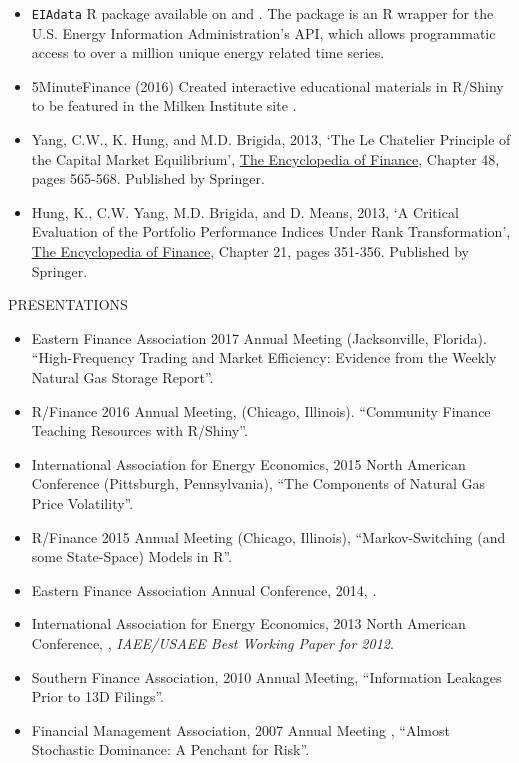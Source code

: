 \documentclass[9pt]{article}
\begin{document}
\begin{itemize}[noitemsep, nolistsep]
\item \texttt{EIAdata} R package available on \href{http://cran.r-project.org/package=EIAdata}{\color{Blue}{CRAN (stable)}} and \href{https://github.com/Matt-Brigida/EIAdata}{\color{Blue}{Github (development)}}.  The package is an R wrapper for the U.S. Energy Information Administration's API, which allows programmatic access to over a million unique energy related time series.
\item 5MinuteFinance (2016) Created interactive educational materials in R/Shiny to be featured in the Milken Institute site {\color{blue}{5MinuteFinance.org}}. 
\item Yang, C.W., K. Hung, and M.D. Brigida, 2013, `The Le Chatelier Principle of the Capital Market Equilibrium', \underline{The
Encyclopedia of Finance}, Chapter 48, pages 565-568. Published by Springer.
\item Hung, K., C.W. Yang, M.D. Brigida, and D. Means, 2013, `A Critical Evaluation of the Portfolio Performance
Indices Under Rank Transformation', \underline{The Encyclopedia of Finance}, Chapter 21, pages 351-356. Published by
Springer.
\end{itemize}
\vspace{10pt}
PRESENTATIONS
\begin{itemize}[noitemsep, nolistsep]
  \item Eastern Finance Association 2017 Annual Meeting (Jacksonville, Florida). ``High-Frequency Trading and Market Efficiency: Evidence from the Weekly Natural Gas Storage Report''.
\item  R/Finance 2016 Annual Meeting, (Chicago, Illinois). ``Community Finance Teaching Resources with R/Shiny''.
\item  International Association for Energy Economics, 2015 North American Conference (Pittsburgh, Pennsylvania), ``The Components of Natural Gas Price Volatility''.
\item  R/Finance 2015 Annual Meeting (Chicago, Illinois), ``Markov-Switching (and some State-Space) Models in R''.
\item Eastern Finance Association Annual Conference, 2014, \href{http://ssrn.com/abstract=2371753}{\color{Blue}{The Switching Relationship between Natural Gas and Crude Oil Prices}}.
\item International Association for Energy Economics, 2013 North American Conference, \href{http://papers.ssrn.com/sol3/papers.cfm?abstract_id=2194215}{\color{Blue}{``The Switching Relationship between Natural Gas and Oil Prices''}}, {\it IAEE/USAEE Best Working Paper for 2012}. 
\item Southern Finance Association, 2010 Annual Meeting, ``Information Leakages Prior to 13D Filings''.
\item Financial Management Association, 2007 Annual Meeting , ``Almost Stochastic Dominance: A Penchant for Risk''.
\end{itemize}
\end{document}
